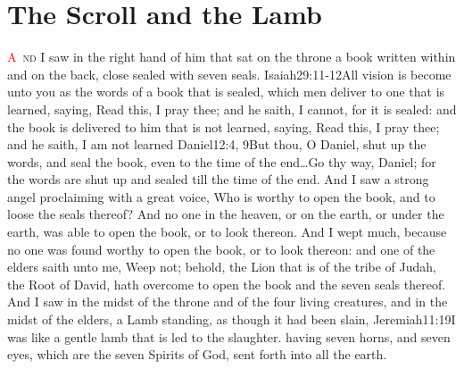 \chapter{The Scroll and the Lamb}
\lettrine[lines=3,slope=0.5em]{\textcolor{red}{A}}{\ nd} I saw in the right hand of him that sat on the throne a book written within and on the back, close sealed with seven seals.%
 					{Isaiah}{29:11-12}{All vision is become unto you as the words of a book that is sealed, which men deliver to one that is learned, saying, Read this, I pray thee; and he saith, I cannot, for it is sealed: and the book is delivered to him that is not learned, saying, Read this, I pray thee; and he saith, I am not learned}%
 					{Daniel}{12:4, 9}{But thou, O Daniel, shut up the words, and seal the book, even to the time of the end\ldots Go thy way, Daniel; for the words are shut up and sealed till the time of the end.} %
And I saw a strong angel proclaiming with a great voice, Who is worthy to open the book, and to loose the seals thereof? %
And no one in the heaven, or on the earth, or under the earth, was able to open the book, or to look thereon. %
And I wept much, because no one was found worthy to open the book, or to look thereon: %
and one of the elders saith unto me, Weep not; behold, the Lion that is of the tribe of Judah,%
the Root of David,%
hath overcome to open the book and the seven seals thereof. %
And I saw in the midst of the throne and of the four living creatures, and in the midst of the elders, a Lamb standing, as though it had been slain,%
					  {Jeremiah}{11:19}{I was like a gentle lamb that is led to the slaughter.} %
having seven horns, and seven eyes, which are the seven Spirits of God, sent forth into all the earth.%
